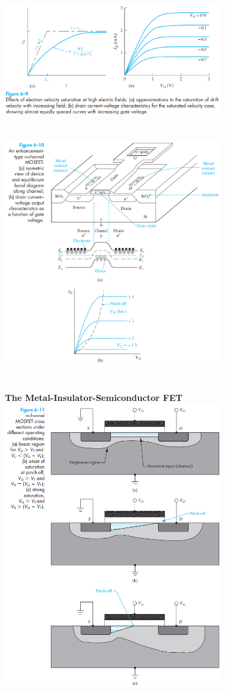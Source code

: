 \documentclass[8pt]{article}
\newcommand{\sect}[1]{\noindent\textbf{#1}\\}
\newcommand{\hl}{\noindent\makebox[\linewidth]{\rule{\textwidth}{0.2pt}}}
\begin{document}
\begin{center}
		\includegraphics[width=0.7\textwidth]{fig6-9} \\ \hl \\~\\
		\includegraphics[width=0.7\textwidth]{fig6-10} \\ \hl \\~\\
		\sect{\Large{The Metal-Insulator-Semiconductor FET}}
		\includegraphics[width=0.7\textwidth]{fig6-11} \\ \hl \\~\\

\end{center}
\end{document}
